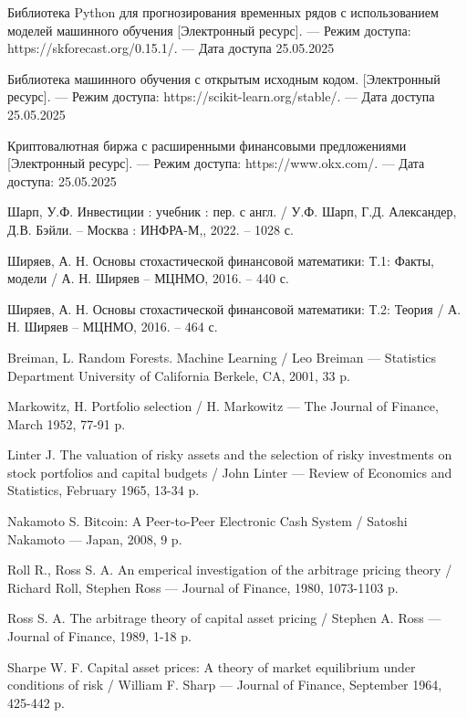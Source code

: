 \newpage
{}
\renewcommand{\bibsection}{\centering\textbf{\large СПИСОК ИСПОЛЬЗОВАННЫХ ИСТОЧНИКОВ}}



\begin{thebibliography}{99}
    Библиотека Python для прогнозирования временных рядов с использованием моделей машинного обучения
    [Электронный ресурс]. --- Режим доступа: https://skforecast.org/0.15.1/. --- Дата доступа 25.05.2025

    Библиотека машинного обучения с открытым исходным кодом.
    [Электронный ресурс]. --- Режим доступа: https://scikit-learn.org/stable/. --- Дата доступа 25.05.2025
    
    Криптовалютная биржа с расширенными финансовыми предложениями
    [Электронный ресурс]. --- 
    Режим доступа: https://www.okx.com/. --- Дата доступа: 25.05.2025

    Шарп, У.Ф. Инвестиции : учебник : пер. с англ. / У.Ф. Шарп, Г.Д. Александер, Д.В. Бэйли. -- Москва : ИНФРА-М,, 2022. -- 1028 с.

    Ширяев, А. Н. Основы стохастической финансовой математики: Т.1: Факты, модели / А. Н. Ширяев -- МЦНМО, 2016. -- 440 с.

    Ширяев, А. Н. Основы стохастической финансовой математики: Т.2: Теория / А. Н. Ширяев -- МЦНМО, 2016. -- 464 с.
    
    Breiman, L. Random Forests. Machine Learning / Leo Breiman --- 
    Statistics Department University of California Berkele, CA, 2001, 33 p.
    
    Markowitz, H. Portfolio selection / 
    H. Markowitz --- The Journal of Finance, March 1952, 77-91 p.

    Linter J. The valuation of risky assets and the selection of risky investments on stock portfolios and capital budgets /
    John Linter --- Review of Economics and Statistics, February 1965, 13-34 p.

    Nakamoto S. Bitcoin: A Peer-to-Peer Electronic Cash System / 
    Satoshi Nakamoto --- Japan, 2008, 9 p.
    
    Roll R., Ross S. A. An emperical investigation of the arbitrage pricing theory /
    Richard Roll, Stephen Ross --- Journal of Finance, 1980, 1073-1103 p.

    Ross S. A. The arbitrage theory of capital asset pricing /
    Stephen A. Ross --- Journal of Finance, 1989, 1-18 p.
    
    Sharpe W. F. Capital asset prices: A theory of market equilibrium under conditions of risk /
    William F. Sharp --- Journal of Finance, September 1964, 425-442 p.

\end{thebibliography}
